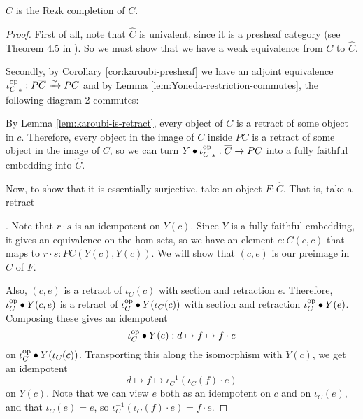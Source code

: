 \begin{lemma}\label{lem:retracts-rezk}
  $ \hat C $ is the Rezk completion of $ \overline C $.
\end{lemma}
\begin{proof}
  First of all, note that $ \hat C $ is univalent, since it is a presheaf category (see Theorem 4.5 in \autocite{univalent-categories}). So we must show that we have a weak equivalence from $ \overline C $ to $ \hat C $.

  Secondly, by Corollary \ref{cor:karoubi-presheaf} we have an adjoint equivalence $ {\iota_C^{\text{op}}}_*: P \overline C \xrightarrow \sim P C $ and by Lemma \ref{lem:Yoneda-restriction-commutes}, the following diagram 2-commutes:
  \begin{center}
  \end{center}

  By Lemma \ref{lem:karoubi-is-retract}, every object of $ \overline C $ is a retract of some object in $ c $. Therefore, every object in the image of $ \overline C $ inside $ P C $ is a retract of some object in the image of $ C $, so we can turn $ Y \bullet {\ensuremath{\iota_C^{\text{op}}}}_* : \overline C \to P C $ into a fully faithful embedding into $ \hat C $.

  Now, to show that it is essentially surjective, take an object $ F : \hat C $. That is, take a retract . Note that $ r \cdot s $ is an idempotent on $ Y(c) $. Since $ Y $ is a fully faithful embedding, it gives an equivalence on the hom-sets, so we have an element $ e : C(c, c) $ that maps to $ r \cdot s : P C (Y(c), Y(c)) $. We will show that $ (c, e) $ is our preimage in $ \overline C $ of $ F $.

  Also, $ (c, e) $ is a retract of $ \iota_C(c) $ with section and retraction $ e $. Therefore, $ \iota_C^{\text{op}} \bullet Y(c, e) $ is a retract of $ \iota_C^{\text{op}} \bullet Y (\iota_C (c)) $ with section and retraction $ \iota_C^{\text{op}} \bullet Y(e) $. Composing these gives an idempotent
  \[ \iota_C^{\text{op}} \bullet Y(e): d \mapsto f \mapsto f \cdot e \]
  on $ \iota_C^{\text{op}} \bullet Y (\iota_C (c)) $. Transporting this along the isomorphism with $ Y(c) $, we get an idempotent
  \[ d \mapsto f \mapsto \iota_C^{-1}(\iota_C(f) \cdot e) \]
  on $ Y(c) $. Note that we can view $ e $ both as an idempotent on $ c $ and on $ \iota_C(e) $, and that $ \iota_C(e) = e $, so $ \iota_C^{-1}(\iota_C(f) \cdot e) = f \cdot e $.


\end{proof}
